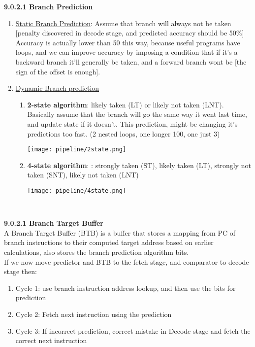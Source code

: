\documentclass[10pt]{article}
\begin{document}
\textbf{9.0.2.1 Branch Prediction}\\
\begin{enumerate}
    \item \underline{Static Branch Prediction}: Assume that branch will always not be taken [penalty discovered in decode stage, and predicted accuracy should be 50\%] Accuracy is actually lower than 50 this way, because useful programs have loops, and we can improve accuracy by imposing a condition that if it's a backward branch it'll generally be taken, and a forward branch wont be [the sign of the offset is enough].
    \item \underline{Dynamic Branch prediction}
    \begin{enumerate}
        \item
        \begin{minipage}{0.6\textwidth}
         \textbf{2-state algorithm}:  likely taken (LT) or likely not taken (LNT). Basically assume that the branch will go the same way it went last time, and update state if it doesn't. This prediction, might be changing it's predictions too fast. (2 nested loops, one longer 100, one just 3)
        \end{minipage} \hfill
        \begin{minipage}{0.35\textwidth}
        \texttt{[image: pipeline/2state.png]}
        \end{minipage}
        \item
        \begin{minipage}{0.60\textwidth}
         \textbf{4-state algorithm}:  : strongly taken (ST), likely taken (LT), strongly not taken (SNT), likely not taken (LNT)
        \end{minipage} \hfill
        \begin{minipage}{0.35\textwidth}
        \texttt{[image: pipeline/4state.png]}
        \end{minipage}
        \\
    \end{enumerate}
\end{enumerate}
\textbf{9.0.2.1 Branch Target Buffer}\\
A Branch Target Buffer (BTB) is a buffer that stores a mapping from PC of branch instructions to their computed target address based on earlier calculations, also stores the branch prediction algorithm bits.\\
If we now move predictor and BTB to the fetch stage, and comparator to decode stage then:
\begin{enumerate}
    \item Cycle 1: use branch instruction address lookup, and then use the bits for prediction
    \item Cycle 2: Fetch next instruction using the prediction
    \item Cycle 3: If incorrect prediction, correct mistake in Decode stage and fetch the correct next instruction
\end{enumerate}
\newpage
\end{document}
